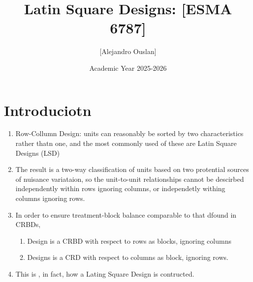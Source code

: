 \documentclass[10pt, oneside]{article}
\title{Latin Square Designs: [ESMA 6787]}
\author{[Alejandro Ouslan]}
\date{Academic Year 2025-2026}
\begin{document}
\maketitle
\tableofcontents

\vspace{.25in}

\section{Introduciotn}
\begin{enumerate}
	\item Row-Collumn Design: units can reasonably be sorted by two
	      characteristics rather thatn one, and the most commonly used of
	      these are Latin Square Designs (LSD)
	\item The result is a two-way classification of units based on two
	      protential sources of nuisance variataion, so the unit-to-unit relationships
	      cannot be descirbed independently within rows ignoring columns, or
	      independetly withing columns ignoring rows.
	\item In order to ensure treatment-block balance comparable to that dfound in
	      CRBDs,
	      \begin{enumerate}
		      \item Design is a CRBD with respect to rows as blocks, ignoring columns
		      \item Designs is a CRD with respect to columns as block, ignoring rows.
	      \end{enumerate}
	\item This is , in fact, how a Lating Square Design is contructed.
\end{enumerate}
\end{document}
